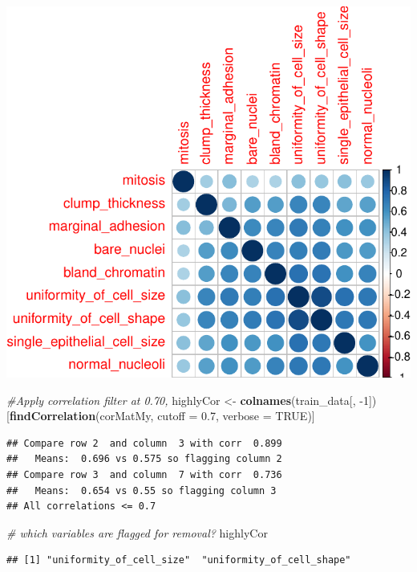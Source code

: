 \documentclass[]{article}
\newenvironment{Shaded}{\begin{snugshade}}{\end{snugshade}}
\newcommand{\KeywordTok}[1]{\textcolor[rgb]{0.13,0.29,0.53}{\textbf{{#1}}}}
\newcommand{\DataTypeTok}[1]{\textcolor[rgb]{0.13,0.29,0.53}{{#1}}}
\newcommand{\DecValTok}[1]{\textcolor[rgb]{0.00,0.00,0.81}{{#1}}}
\newcommand{\FloatTok}[1]{\textcolor[rgb]{0.00,0.00,0.81}{{#1}}}
\newcommand{\StringTok}[1]{\textcolor[rgb]{0.31,0.60,0.02}{{#1}}}
\newcommand{\CommentTok}[1]{\textcolor[rgb]{0.56,0.35,0.01}{\textit{{#1}}}}
\newcommand{\OtherTok}[1]{\textcolor[rgb]{0.56,0.35,0.01}{{#1}}}
\newcommand{\NormalTok}[1]{{#1}}
\begin{document}
\includegraphics{webinar_code_files/figure-latex/unnamed-chunk-25-1.pdf}

\begin{Shaded}
\begin{Highlighting}[]
\CommentTok{#Apply correlation filter at 0.70,}
\NormalTok{highlyCor <-}\StringTok{ }\KeywordTok{colnames}\NormalTok{(train_data[, -}\DecValTok{1}\NormalTok{])[}\KeywordTok{findCorrelation}\NormalTok{(corMatMy, }\DataTypeTok{cutoff =} \FloatTok{0.7}\NormalTok{, }\DataTypeTok{verbose =} \OtherTok{TRUE}\NormalTok{)]}
\end{Highlighting}
\end{Shaded}

\begin{verbatim}
## Compare row 2  and column  3 with corr  0.899 
##   Means:  0.696 vs 0.575 so flagging column 2 
## Compare row 3  and column  7 with corr  0.736 
##   Means:  0.654 vs 0.55 so flagging column 3 
## All correlations <= 0.7
\end{verbatim}

\begin{Shaded}
\begin{Highlighting}[]
\CommentTok{# which variables are flagged for removal?}
\NormalTok{highlyCor}
\end{Highlighting}
\end{Shaded}

\begin{verbatim}
## [1] "uniformity_of_cell_size"  "uniformity_of_cell_shape"
\end{verbatim}
\end{document}
